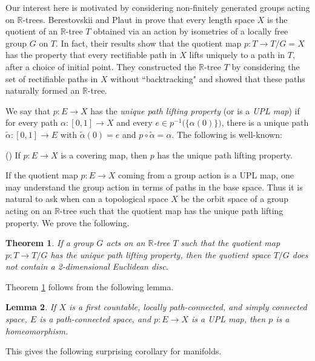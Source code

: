 \documentclass[12pt, leqno]{amsart}
\newcommand{\ui}{[0,1]}
\newcommand{\wt}{\widetilde}
\newtheorem{theorem}{Theorem}[section]
\newtheorem{lemma}[theorem]{Lemma}
\theoremstyle{definition}\newtheorem{definition}[theorem]{Definition}
\begin{document}
Our interest here is motivated by considering  non-finitely generated groups acting on $\mathbb R$-trees. Berestovskii  and Plaut in \cite{BP10rtrees}  prove that every length space $X$ is the quotient of an $\mathbb R$-tree $T$ obtained via an action by isometries of a locally free group $G$ on $T$.  In fact, their results show that the quotient map $p: T\to  T/G=X$ has the property that every rectifiable path in $X$ lifts uniquely to a path in $T$, after a choice of initial point.  They constructed the $\mathbb R$-tree $T$ by considering the set of rectifiable paths in $X$ without ``backtracking" and showed that these paths naturally formed an $\mathbb R$-tree.

We say that $p:E\to X$ has the \emph{unique path lifting property} (or is a \textit{UPL map}) if for every path $\alpha:\ui\to X$ and every $e\in p^{-1}\big(\big\{\alpha(0)\big\}\big)$, there is a unique path $\wt{\alpha}:\ui\to E$ with $\wt{\alpha}(0)=e$ and $p\circ \wt\alpha= \alpha$. The following is well-known: 

\begin{center}
    (\textasteriskcentered) If $p:E\to X$ is a covering map, then $p$ has the unique path lifting property.
\end{center}

If the quotient map $p:E\to X$ coming from a group action is a UPL map, one may understand the group action in terms of paths in the base space. Thus it is natural to ask when can a topological space $X$ be the orbit space of a group acting on an $\mathbb R$-tree such that the quotient map has the unique path lifting property.  We prove the following.

\begin{theorem}\label{orbit}
  If a group $G$ acts on an $\mathbb R$-tree $T$ such that the quotient map $p: T\to T/G$ has the unique path lifting property, then the quotient space $T/G$ does not contain a 2-dimensional Euclidean disc.
\end{theorem}

\noindent Theorem \ref{orbit} follows from the following lemma.

\begin{lemma}\label{lemdydaksproblem}
If $X$ is a first countable, locally path-connected, and simply connected space, $E$ is a path-connected space, and $p:E\to X$ is a UPL map, then $p$ is a homeomorphism.
\end{lemma}

This gives the following surprising corollary for manifolds.
\end{document}
